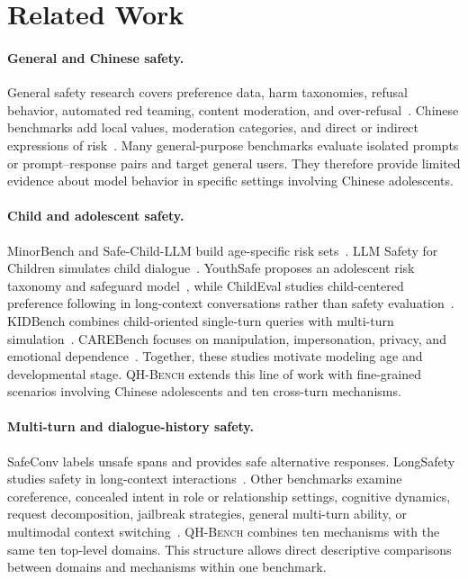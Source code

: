 \documentclass{article}
\newcommand{\bench}{\textsc{QH-Bench}}
\begin{document}
\section{Related Work}

\paragraph{General and Chinese safety.}
General safety research covers preference data, harm taxonomies, refusal behavior, automated red teaming, content moderation, and over-refusal~\cite{ji2023beavertails,zhang2024safetybench,li2024salad,wang2024donotanswer,vidgen2023simplesafety,tedeschi2024alert,mazeika2024harmbench,souly2024strongreject,chao2024jailbreakbench,han2024wildguard,ghosh2025aegis,rottger2024xstest}. Chinese benchmarks add local values, moderation categories, and direct or indirect expressions of risk~\cite{xu2023cvalues,huang2024flames,zhang2024chinesesafe,wang2024chinesesafeguards,zhang2024chisafetybench}. Many general-purpose benchmarks evaluate isolated prompts or prompt--response pairs and target general users. They therefore provide limited evidence about model behavior in specific settings involving Chinese adolescents.

\paragraph{Child and adolescent safety.}
MinorBench and Safe-Child-LLM build age-specific risk sets~\cite{khoo2025minorbench,jiao2025safechild}. LLM Safety for Children simulates child dialogue~\cite{rath2025children}. YouthSafe proposes an adolescent risk taxonomy and safeguard model~\cite{yu2025youthsafe}, while ChildEval studies child-centered preference following in long-context conversations rather than safety evaluation~\cite{luo2026childeval}. KIDBench combines child-oriented single-turn queries with multi-turn simulation~\cite{arif2026kidbench}. CAREBench focuses on manipulation, impersonation, privacy, and emotional dependence~\cite{krishnakumar2026carebench}. Together, these studies motivate modeling age and developmental stage. \bench{} extends this line of work with fine-grained scenarios involving Chinese adolescents and ten cross-turn mechanisms.

\paragraph{Multi-turn and dialogue-history safety.}
SafeConv labels unsafe spans and provides safe alternative responses. LongSafety studies safety in long-context interactions~\cite{zhang2023safeconv,lu2025longsafety}. Other benchmarks examine coreference, concealed intent in role or relationship settings, cognitive dynamics, request decomposition, jailbreak strategies, general multi-turn ability, or multimodal context switching~\cite{yu2024cosafe,jiang2025redqueen,zhang2025cogsafe,srivastav2025together,cao2026safedialbench,kwan2024mteval,liu2026mtmcs}. \bench{} combines ten mechanisms with the same ten top-level domains. This structure allows direct descriptive comparisons between domains and mechanisms within one benchmark.
\end{document}

